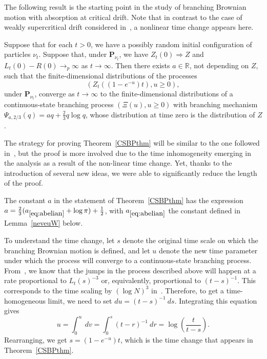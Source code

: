 \documentclass[AHL,Unicode,longabstracts,published]{cedram}
\renewcommand*\P{\mathbf{P}}
\newcommand*\R{\mathbb{R}}
\newcommand{\1} {\mathds{1}}
\begin{document}
The following result is the starting point in the study of branching Brownian motion with absorption at critical drift. Note that in contrast to the case of weakly supercritical drift considered in~\cite{bbs2}, a nonlinear time change appears here.

\begin{theo}\label{CSBPthm}
Suppose that for each $t > 0$, we have a possibly random initial configuration of particles $\nu_t$. Suppose that, under $\P_{\nu_t}$, we have $Z_t(0) \Rightarrow Z$ and $L_t(0) - R(0) \rightarrow_p \infty$ as $t \rightarrow \infty$. Then there exists $a \in \R$, not depending on $Z$, such that
the finite-dimensional distributions of the processes
\[
\left(Z_t\left(\left(1 - e^{-u}\right) t\right), u \geq 0\right),
\]
under $\P_{\nu_t}$, converge as $t \rightarrow \infty$ to the finite-dimensional distributions of a continuous-state branching process $(\Xi(u), u \geq 0)$ with branching mechanism $\Psi_{a,2/3}(q) = aq + \frac{2}{3} q \log q$, whose distribution at time zero is the distribution of $Z$.
\end{theo}

The strategy for proving Theorem~\ref{CSBPthm} will be similar to the one followed in~\cite{bbs2}, but the proof is more involved due to the time inhomogeneity emerging in the analysis as a result of the non-linear time change. Yet, thanks to the introduction of several new ideas, we were able to significantly reduce the length of the proof.

\begin{rema}
The constant $a$ in the statement of Theorem~\ref{CSBPthm} has the expression $a=\frac{2}{3}(a_{\eqref{eq:abelian}}+\log \pi)+\frac{1}{2}$, with $a_{\eqref{eq:abelian}}$ the constant defined in Lemma~\ref{neveuW} below.
\end{rema}

\begin{rema}
To understand the time change, let $s$ denote the original time scale on which the branching Brownian motion is defined, and let $u$ denote the new time parameter under which the process will converge to a continuous-state branching process. From~\cite{bbs2}, we know that the jumps in the process described above will happen at a rate proportional to $L_t(s)^{-3}$ or, equivalently, proportional to $(t - s)^{-1}$. This corresponds to the time scaling by $(\log N)^3$ in~\cite{bbs2}. Therefore, to get a time-homogeneous limit, we need to set $du = (t - s)^{-1} \: ds.$ Integrating this equation gives
\[
u = \int_0^u \: dv = \int_0^s (t - r)^{-1} \: dr = \log \left(\frac{t}{t-s} \right).
\]
Rearranging, we get $s = (1 - e^{-u}) t$, which is the time change that appears in Theorem~\ref{CSBPthm}.
\end{rema}
\end{document}
